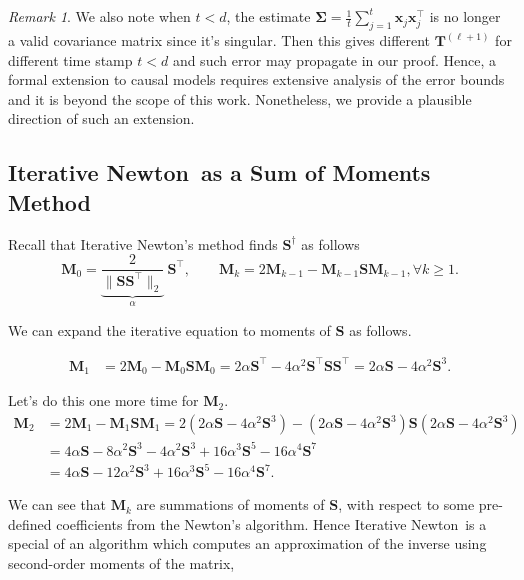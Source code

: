 \documentclass[11pt]{article}
\theoremstyle{plain}
\theoremstyle{definition}
\theoremstyle{remark}
\newtheorem{remark}[theorem]{Remark}
\renewcommand{\^}[1]{^{(#1)}}
\newcommand{\bx}{\boldsymbol{x}}
\newcommand{\bM}{\boldsymbol{M}}
\newcommand{\bS}{\boldsymbol{S}}
\newcommand{\bT}{\boldsymbol{T}}
\newcommand{\bSigma}{\boldsymbol{\Sigma}}
\newcommand{\newton}{Iterative Newton}
\begin{document}
{\begin{remark}
We also note when $t < d$, the estimate  $\hat{\bSigma} = \frac{1}{t}\sum_{j=1}^t \bx_j  \bx_j^\top$ is no longer a valid covariance matrix since it's singular. Then this gives different $\bT^{(\ell+1)}$ for different time stamp $t < d$ and such error may propagate in our proof. Hence, a formal extension to causal models requires extensive analysis of the error bounds and it is beyond the scope of this work. Nonetheless, we provide a plausible direction of such an extension. 

\end{remark}
}

\subsection{\newton\ as a Sum of Moments Method}\label{sec:newton_moment}
Recall that \newton's method finds $\bS^\dagger$ as follows 
\begin{equation}
    \bM_0 = \underbrace{\frac{2}{\|\bS\bS^\top\|_2}}_{\alpha} ~ \bS^\top, \qquad \bM_k = 2 \bM_{k-1} - \bM_{k-1} \bS \bM_{k-1}, \forall k \geq 1.
\end{equation}

We can expand the iterative equation to moments of $\bS$ as follows. 

\begin{equation}
    \begin{aligned}
        \bM_1 &= 2 \bM_0 - \bM_0 \bS \bM_0  = 2 \alpha \bS^\top - 4 \alpha^2 \bS^\top \bS \bS^\top = 2 \alpha \bS - 4 \alpha^2 \bS^3 .
    \end{aligned}
\end{equation}

Let's do this one more time for $\bM_2$.
\begin{equation}
    \begin{aligned}
        \bM_2 &= 2 \bM_{1} - \bM_{1} \bS \bM_{1} = 2 (2 \alpha \bS - 4 \alpha^2 \bS^3) - (2 \alpha \bS - 4 \alpha^2 \bS^3) \bS (2 \alpha \bS - 4 \alpha^2 \bS^3) \\
        &= 4 \alpha \bS - 8 \alpha^2 \bS^3 - 4 \alpha^2 \bS^3 + 16 \alpha^3 \bS^5 - 16\alpha^4 \bS^7 \\
        &= 4 \alpha \bS - 12 \alpha^2 \bS^3  + 16 \alpha^3 \bS^5 - 16\alpha^4 \bS^7.
    \end{aligned}
\end{equation}

We can see that $\bM_k$ are  summations of moments of $\bS$, with respect to some pre-defined coefficients from the Newton's algorithm. Hence \newton\ is a special of an algorithm which computes an approximation of the inverse using second-order moments of the matrix, 
\end{document}
